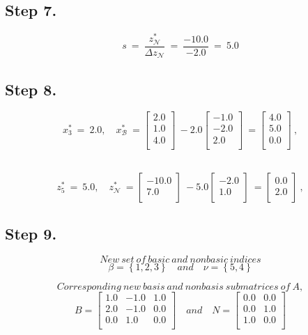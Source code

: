 \documentclass [12pt] {article}
\begin{document}
\subsection{Step 7.}
\[
s \ =\ \frac{z_{\mathcal N}^{*}}{ \Delta z_{\mathcal N}}\ =\ \frac{-10.0}{-2.0}\ =\ 5.0
\]
\subsection{Step 8.}
\[
x_{3}^{*}\ =\ 2.0, \quad x_{\mathcal B}^{*}\ =\begin{bmatrix}
2.0 \\ 1.0 \\ 4.0 \\ 
\end{bmatrix}\ -2.0\begin{bmatrix}
-1.0 \\ -2.0 \\ 2.0 \\ 
\end{bmatrix}\ =\begin{bmatrix}
4.0 \\ 5.0 \\ 0.0 \\ 
\end{bmatrix}\ ,
\]
\

\[
z_{5}^{*}\ =\ 5.0, \quad z_{\mathcal N}^{*}\ =\begin{bmatrix}
-10.0 \\ 7.0 \\ 
\end{bmatrix}\ -5.0\begin{bmatrix}
-2.0 \\ 1.0 \\ 
\end{bmatrix}\ =\begin{bmatrix}
0.0 \\ 2.0 \\ 
\end{bmatrix}\ ,
\]
\subsection{Step 9.}

\[ New\ set\  of\  basic\  and\  nonbasic\  indices \]
\[
\beta= \left\{1, 2, 3\right\} \quad and \quad  \nu=\left\{5, 4\right\}
\]

\[
Corresponding\ new\ basis\ and\ nonbasis\ submatrices\ of\ A,
\]
\[
B =
\begin{bmatrix}
1.0 & -1.0 & 1.0 \\ 2.0 & -1.0 & 0.0 \\ 0.0 & 1.0 & 0.0 \\ 
\end{bmatrix} \quad and \quad
\mathit{N} =
\begin{bmatrix}
0.0 & 0.0 \\ 0.0 & 1.0 \\ 1.0 & 0.0 \\ 
\end{bmatrix}
\]
\end{document}
